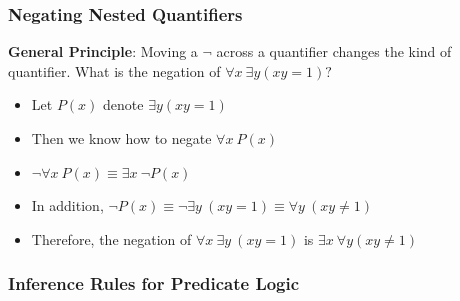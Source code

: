\documentclass[12pt, letterpaper]{article}
\begin{document}
\pagebreak

\subsubsection{Negating Nested Quantifiers}
\bigbreak
\textbf{General Principle}: Moving a $\neg$ across a quantifier changes the kind of quantifier.
\bigbreak
What is the negation of $\forall x \ \exists y (xy = 1)?$
\begin{itemize}[label={}]
	\item Let $P(x)$ denote $\exists y (xy = 1)$
	\item Then we know how to negate $\forall x \ P(x)$
	\item $\neg \forall x \ P(x) \equiv \exists x \ \neg P(x)$
	\item In addition, $\neg P(x) \equiv \neg \exists y \ (xy = 1) \equiv \forall y \ (xy \ne 1)$
	\item Therefore, the negation of $\forall x \ \exists y \ (xy =1)$ is $\exists x \ \forall y (xy \ne 1)$
\end{itemize}

\pagebreak

\subsubsection{Inference Rules for Predicate Logic}
\bigbreak
\bigbreak
\end{document}
